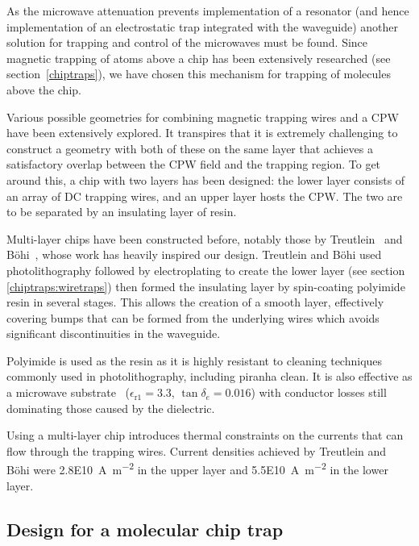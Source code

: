 As the microwave attenuation prevents implementation of a resonator (and hence
implementation of an electrostatic trap integrated with the waveguide) another
solution for trapping and control of the microwaves must be found. Since
magnetic trapping of atoms above a chip has been extensively researched (see
section~\ref{chiptraps}), we have chosen this mechanism for trapping of molecules
above the chip.

Various possible geometries for combining magnetic trapping wires and a CPW have
been extensively explored. It transpires that it is extremely challenging to
construct a geometry with both of these on the same layer that achieves a
satisfactory overlap between the CPW field and the trapping region. To get
around this, a chip with two layers has been designed: the lower layer consists
of an array of DC trapping wires, and an upper layer hosts the CPW. The two are
to be separated by an insulating layer of resin.

Multi-layer chips have been constructed before, notably those by
Treutlein~\cite{Treutlein2008} and B\"ohi~\cite{rohtua}, whose work has heavily
inspired our design. Treutlein and B\"ohi used photolithography followed by
electroplating to create the lower layer (see section \ref{chiptraps:wiretraps})
then formed the insulating layer by spin-coating polyimide resin in several
stages. This allows the creation of a smooth layer, effectively covering bumps
that can be formed from the underlying wires which avoids significant
discontinuities in the waveguide.

Polyimide is used as the resin as it is highly resistant to cleaning techniques
commonly used in photolithography, including piranha clean.  It is also
effective as a microwave substrate~\cite{Simons2004} 
($\epsilon_\mathrm{r1} = 3.3$, $\tan\delta_e = 0.016$) with conductor losses
still dominating those caused by the dielectric.

Using a multi-layer chip introduces thermal constraints on the currents that can
flow through the trapping wires. Current densities achieved by Treutlein and
B\"ohi \cite{} were \SI{2.8E10}{\ampere\per\metre\squared} in the upper layer and
\SI{5.5E10}{\ampere\per\metre\squared} in the lower layer.


\subsection{Design for a molecular chip trap}


